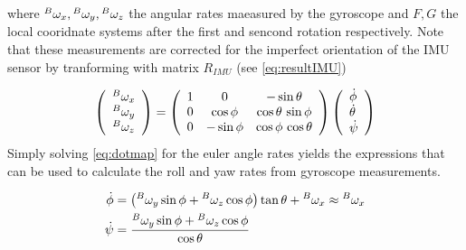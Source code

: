     where \ensuremath{\prescript{B}{}{\omega_{x}},\prescript{B}{}{\omega_{y}},\prescript{B}{}{\omega_{z}}} the angular rates maeasured by the gyroscope and \ensuremath{F,G} the local cooridnate systems after the first and sencond rotation respectively. Note that these measurements are corrected for the imperfect orientation of the IMU sensor by tranforming with matrix \ensuremath{R_{\mathit{IMU}}} (see \cref{eq:resultIMU})

    \begin{equation}
    \left(\begin{array}{c}{\prescript{B}{}{\omega_{x}}} \\ {\prescript{B}{}{\omega_{y}}} \\ {\prescript{B}{}{\omega_{z}}}\end{array}\right)=\left(\begin{array}{ccc} 1 & 0 & -\sin\theta \\ 0 & \cos\phi & \cos\theta \,\sin\phi \\ 0 & -\sin\phi & \cos\phi\,\cos\theta \end{array}\right)\left(\begin{array}{l}{\dot{\phi}} \\ {\dot{\theta}} \\ {\dot{\psi}}\end{array}\right)
        \label{eq:dotmap}
    \end{equation}
    Simply solving \cref{eq:dotmap} for the euler angle rates yields the expressions that can be used to calculate the roll and yaw rates from gyroscope measurements. 

\begin{align}
    \dot{\phi} &=\left(\prescript{B}{}{\omega_{y}} \sin \phi+\prescript{B}{}{\omega_{z}} \cos \phi\right) \tan \theta+\prescript{B}{}{\omega_{x}} \approx \prescript{B}{}{\omega_{x}}
    \label{eq:appb1}
    \\
    \dot{\psi} &=\frac{\prescript{B}{}{\omega_{y}} \sin \phi+\prescript{B}{}{\omega_{z}} \cos \phi}{\cos \theta}
    \label{eq:appb2}
\end{align}

